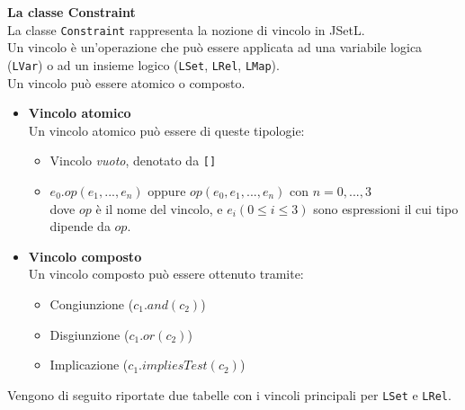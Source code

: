 \textbf{La classe Constraint}\\
La classe \texttt{Constraint} rappresenta la nozione di vincolo in JSetL.\\
Un vincolo è un'operazione che può essere applicata ad una variabile logica (\texttt{LVar}) o ad un insieme logico (\texttt{LSet}, \texttt{LRel}, \texttt{LMap}).\\
Un vincolo può essere atomico o composto.\\

\begin{itemize}
\item \textbf{Vincolo atomico}\\
Un vincolo atomico può essere di queste tipologie:
\begin{itemize}
\item Vincolo \emph{vuoto}, denotato da \texttt{[]}
\item $ e_{0}.op(e_{1},...,e_{n}) $ oppure $op(e_{0},e_{1},...,e_{n}) $ con $ n = 0,...,3 $\\
dove $op$ è il nome del vincolo, e $e_{i} (0 \le i \le 3)$ sono espressioni il cui tipo dipende da $op$.\\
\end{itemize}

\clearpage

\item \textbf{Vincolo composto}\\
Un vincolo composto può essere ottenuto tramite:
\begin{itemize}
\item Congiunzione ($ c_{1}.and(c_{2}) $)
\item Disgiunzione ($ c_{1}.or(c_{2}) $)
\item Implicazione ($ c_{1}.impliesTest(c_{2}) $)\\
\end{itemize}

\end{itemize}

Vengono di seguito riportate due tabelle con i vincoli principali per \texttt{LSet} e \texttt{LRel}.\\

